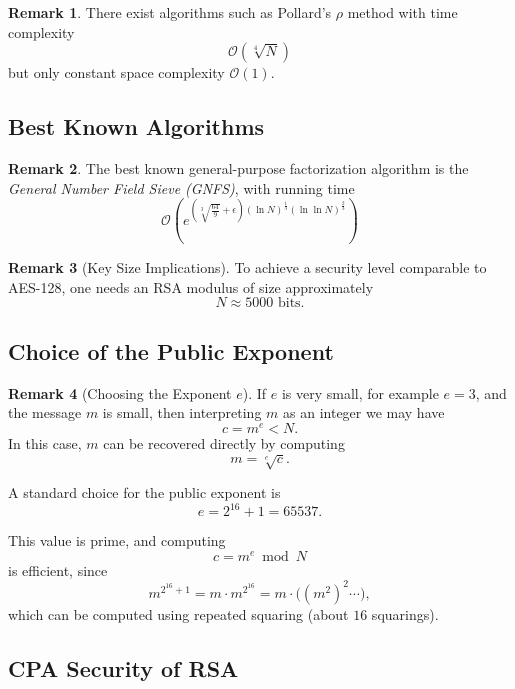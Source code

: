 \documentclass[11pt]{article}
\theoremstyle{definition}
\newtheorem{remark}{Remark}[section]
\theoremstyle{proof}
\begin{document}
	\begin{remark}
		There exist algorithms such as Pollard's $\rho$ method
		with time complexity
		$$
		\mathcal{O}(\sqrt[4]{N})
		$$
		but only constant space complexity $\mathcal{O}(1)$.
	\end{remark}
	
	\subsection{Best Known Algorithms}
	
	\begin{remark}
		The best known general-purpose factorization algorithm is the
		\emph{General Number Field Sieve (GNFS)}, with running time
		$$
		\mathcal{O}(e ^{ (\sqrt[3]{\frac{64}{9}} + \epsilon) (\ln N)^\frac{1}{3} (\ln \ln N)^\frac{2}{3}})
		$$
	\end{remark}
	
	\begin{remark}[Key Size Implications]
		To achieve a security level comparable to AES-128,
		one needs an RSA modulus of size approximately
		$$
		N \approx 5000 \text{ bits}.
		$$
	\end{remark}
	
	\subsection{Choice of the Public Exponent}
	
	\begin{remark}[Choosing the Exponent $e$]
		If $e$ is very small, for example $e=3$, and the message $m$ is small,
		then interpreting $m$ as an integer we may have
		$$
		c = m^e < N.
		$$
		In this case, $m$ can be recovered directly by computing
		$$
		m = \sqrt[e]{c}.
		$$
	\end{remark}
	
	A standard choice for the public exponent is
	$$
	e = 2^{16} + 1 = 65537.
	$$
	
	This value is prime, and computing
	$$
	c = m^e \bmod N
	$$
	is efficient, since
	$$
	m^{2^{16}+1} = m \cdot m^{2^{16}}
	= m \cdot \bigl((m^2)^2 \cdots \bigr),
	$$
	which can be computed using repeated squaring (about $16$ squarings).
	
	\subsection{CPA Security of RSA}
	
\end{document}
